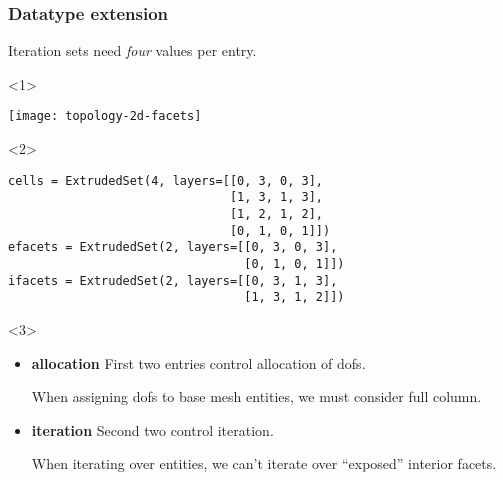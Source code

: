 \documentclass[presentation]{beamer}
\begin{document}
\begin{frame}[fragile]
  \frametitle{Datatype extension}
  Iteration sets need \emph{four} values per entry.

  \begin{overlayarea}{\textwidth}{0.7\textheight}
    \begin{onlyenv}<1>
      \begin{center}
        \texttt{[image: topology-2d-facets]}
      \end{center}
    \end{onlyenv}
    \begin{onlyenv}<2>
\begin{verbatim}
cells = ExtrudedSet(4, layers=[[0, 3, 0, 3], 
                               [1, 3, 1, 3],
                               [1, 2, 1, 2],
                               [0, 1, 0, 1]])
efacets = ExtrudedSet(2, layers=[[0, 3, 0, 3],
                                 [0, 1, 0, 1]])
ifacets = ExtrudedSet(2, layers=[[0, 3, 1, 3],
                                 [1, 3, 1, 2]])
\end{verbatim}
    \end{onlyenv}
    \begin{onlyenv}<3>
      \begin{itemize}
      \item \textbf{allocation} First two entries control allocation of dofs.

        When assigning dofs to base mesh entities, we must consider
        full column.
      \item \textbf{iteration} Second two control iteration.

        When iterating over entities, we can't iterate over ``exposed''
        interior facets.
      \end{itemize}
    \end{onlyenv}
  \end{overlayarea}
\end{frame}
\end{document}
